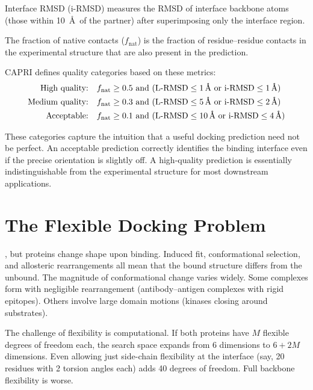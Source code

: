 Interface RMSD (i-RMSD) measures the RMSD of interface backbone atoms (those within 10~\AA\ of the partner) after superimposing only the interface region.

The fraction of native contacts ($f_\text{nat}$) is the fraction of residue--residue contacts in the experimental structure that are also present in the prediction.

CAPRI defines quality categories based on these metrics:
\begin{equation}
\label{eq:capri-quality}
\begin{aligned}
\text{High quality:}& \quad f_\text{nat} \geq 0.5 \text{ and } (\text{L-RMSD} \leq 1\text{\,\AA} \text{ or } \text{i-RMSD} \leq 1\text{\,\AA}) \\
\text{Medium quality:}& \quad f_\text{nat} \geq 0.3 \text{ and } (\text{L-RMSD} \leq 5\text{\,\AA} \text{ or } \text{i-RMSD} \leq 2\text{\,\AA}) \\
\text{Acceptable:}& \quad f_\text{nat} \geq 0.1 \text{ and } (\text{L-RMSD} \leq 10\text{\,\AA} \text{ or } \text{i-RMSD} \leq 4\text{\,\AA})
\end{aligned}
\end{equation}

These categories capture the intuition that a useful docking prediction need not be perfect.
An acceptable prediction correctly identifies the binding interface even if the precise orientation is slightly off.
A high-quality prediction is essentially indistinguishable from the experimental structure for most downstream applications.

\section{The Flexible Docking Problem}
\label{sec:flexible-docking}

, but proteins change shape upon binding.
Induced fit, conformational selection, and allosteric rearrangements all mean that the bound structure differs from the unbound.
The magnitude of conformational change varies widely.
Some complexes form with negligible rearrangement (antibody--antigen complexes with rigid epitopes).
Others involve large domain motions (kinases closing around substrates).

The challenge of flexibility is computational.
If both proteins have $M$ flexible degrees of freedom each, the search space expands from 6 dimensions to $6 + 2M$ dimensions.
Even allowing just side-chain flexibility at the interface (say, 20 residues with 2 torsion angles each) adds 40 degrees of freedom.
Full backbone flexibility is worse.

